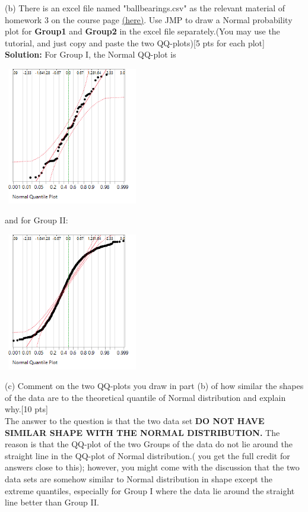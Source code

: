 \documentclass[11pt]{article}\usepackage[]{graphicx}\usepackage[]{color}
\begin{document}
\begin{itemize}
(b) There is an excel file named "ballbearings.csv" as the relevant material of homework 3 on the course page \href{https://ashirazist.github.io/stat305.github.io/homework.html}{(here)}. Use JMP to draw a Normal probability plot for \textbf{Group1} and \textbf{Group2} in the excel file separately.(You may use the tutorial, and just copy and paste the two QQ-plots)[5 pts for each plot] \\
\textbf{Solution:} For Group I, the Normal QQ-plot is
\begin{center}
	\begin{minipage}{\linewidth}
		\centering
		\includegraphics[width=6cm, height=6cm]{hw3p2b1.png}
	\end{minipage}
\end{center}
and for Group II:
\begin{center}
	\begin{minipage}{\linewidth}
		\centering
		\includegraphics[width=6cm, height=6cm]{hw3p2b2.png}
	\end{minipage}
\end{center}
(c) Comment on the two QQ-plots you draw in part (b) of how similar the shapes of the data are to the theoretical quantile of Normal distribution and explain why.[10 pts]\\
The answer to the question is that the two data set \textbf{DO NOT HAVE SIMILAR SHAPE WITH THE NORMAL DISTRIBUTION.} The reason is that the QQ-plot of the two Groups of the data do not lie around the straight line in the QQ-plot of Normal distribution.( you get the full credit for answers close to this); however, you might come with the discussion that the two data sets are somehow similar to Normal distribution in shape except the extreme quantiles, especially for Group I where the data lie around the straight line better than Group II. 



\end{itemize}
\end{document}
